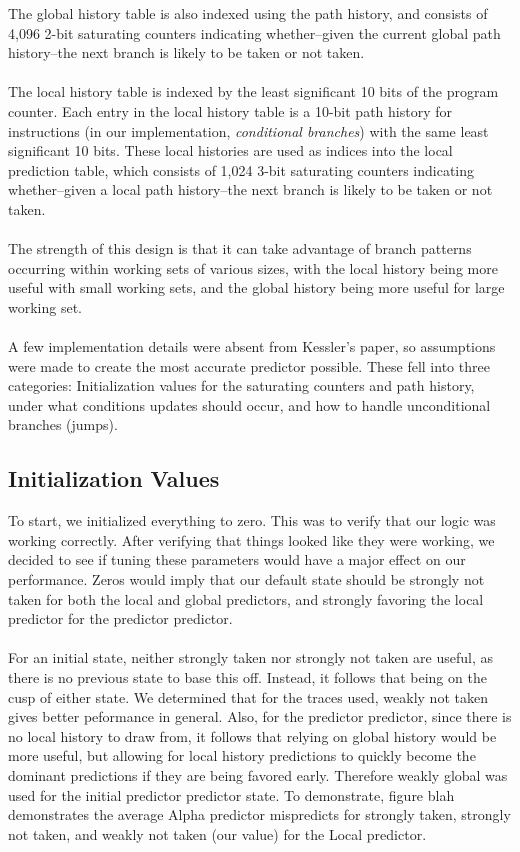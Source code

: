 \documentclass[twocolumn]{article}
\begin{document}
The global history table is also indexed using the path history, and consists of 4,096 2-bit saturating counters indicating whether--given the current global path history--the next branch is likely to be taken or not taken.\\\\
The local history table is indexed by the least significant 10 bits of the program counter.  Each entry in the local history table is a 10-bit path history for instructions (in our implementation, \textit{conditional branches}) with the same least significant 10 bits.  These local histories are used as indices into the local prediction table, which consists of 1,024 3-bit saturating counters indicating whether--given a local path history--the next branch is likely to be taken or not taken.\\\\
The strength of this design is that it can take advantage of branch patterns occurring within working sets of various sizes, with the local history being more useful with small working sets, and the global history being more useful for large working set.\\\\
A few implementation details were absent from Kessler's paper, so assumptions were made to create the most accurate predictor possible.  These fell into three categories:  Initialization values for the saturating counters and path history, under what conditions updates should occur, and how to handle unconditional branches (jumps).
\subsection{Initialization Values}
To start, we initialized everything to zero. This was to verify that our logic was working correctly. After verifying that things looked like they were working, we decided to see if tuning these parameters would have a major effect on our performance. Zeros would imply that our default state should be strongly not taken for both the local and global predictors, and strongly favoring the local predictor for the predictor predictor.\\\\
For an initial state, neither strongly taken nor strongly not taken are useful, as there is no previous state to base this off. Instead, it follows that being on the cusp of either state. We determined that for the traces used, weakly not taken gives better peformance in general. Also, for the predictor predictor, since there is no local history to draw from, it follows that relying on global history would be more useful, but allowing for local history predictions to quickly become the dominant predictions if they are being favored early. Therefore weakly global was used for the initial predictor predictor state. 
To demonstrate, figure blah demonstrates the average Alpha predictor mispredicts for strongly taken, strongly not taken, and weakly not taken (our value) for the Local predictor. 
\end{document}
